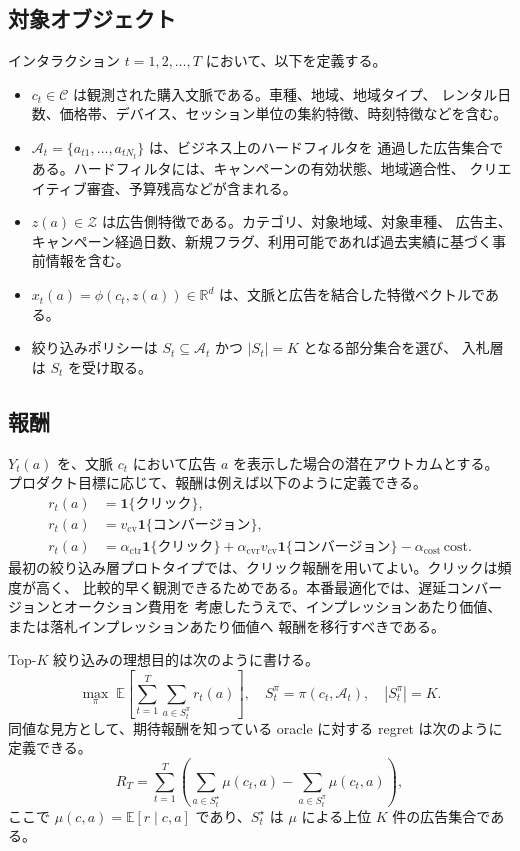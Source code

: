 \documentclass[uplatex,dvipdfmx,11pt,a4paper]{bxjsarticle}
\newcommand{\R}{\mathbb{R}}
\newcommand{\E}{\mathbb{E}}
\newcommand{\ind}{\mathbf{1}}
\begin{document}
\subsection{対象オブジェクト}
インタラクション $t=1,2,\ldots,T$ において、以下を定義する。
\begin{itemize}[leftmargin=2em]
  \item $c_t \in \mathcal{C}$ は観測された購入文脈である。車種、地域、地域タイプ、
  レンタル日数、価格帯、デバイス、セッション単位の集約特徴、時刻特徴などを含む。
  \item $\mathcal{A}_t = \{a_{t1},\ldots,a_{tN_t}\}$ は、ビジネス上のハードフィルタを
  通過した広告集合である。ハードフィルタには、キャンペーンの有効状態、地域適合性、
  クリエイティブ審査、予算残高などが含まれる。
  \item $z(a) \in \mathcal{Z}$ は広告側特徴である。カテゴリ、対象地域、対象車種、
  広告主、キャンペーン経過日数、新規フラグ、利用可能であれば過去実績に基づく事前情報を含む。
  \item $x_t(a)=\phi(c_t,z(a))\in\R^d$ は、文脈と広告を結合した特徴ベクトルである。
  \item 絞り込みポリシーは $S_t\subseteq\mathcal{A}_t$ かつ $|S_t|=K$ となる部分集合を選び、
  入札層は $S_t$ を受け取る。
\end{itemize}

\subsection{報酬}
$Y_t(a)$ を、文脈 $c_t$ において広告 $a$ を表示した場合の潜在アウトカムとする。
プロダクト目標に応じて、報酬は例えば以下のように定義できる。
\begin{align}
  r_t(a) &= \ind\{\text{クリック}\}, \\
  r_t(a) &= v_{\mathrm{cv}}\ind\{\text{コンバージョン}\}, \\
  r_t(a) &= \alpha_{\mathrm{ctr}}\ind\{\text{クリック}\}
          + \alpha_{\mathrm{cvr}}v_{\mathrm{cv}}\ind\{\text{コンバージョン}\}
          - \alpha_{\mathrm{cost}}\,\mathrm{cost}.
\end{align}
最初の絞り込み層プロトタイプでは、クリック報酬を用いてよい。クリックは頻度が高く、
比較的早く観測できるためである。本番最適化では、遅延コンバージョンとオークション費用を
考慮したうえで、インプレッションあたり価値、または落札インプレッションあたり価値へ
報酬を移行すべきである。

Top-$K$ 絞り込みの理想目的は次のように書ける。
\begin{equation}
  \max_{\pi}\; \E\left[\sum_{t=1}^{T}\sum_{a\in S_t^\pi} r_t(a)\right],
  \quad S_t^\pi = \pi(c_t,\mathcal{A}_t),\quad |S_t^\pi|=K.
\end{equation}
同値な見方として、期待報酬を知っている oracle に対する regret は次のように定義できる。
\begin{equation}
  R_T = \sum_{t=1}^{T}
  \left(
    \sum_{a\in S_t^\star}\mu(c_t,a)
    - \sum_{a\in S_t^\pi}\mu(c_t,a)
  \right),
\end{equation}
ここで $\mu(c,a)=\E[r\mid c,a]$ であり、$S_t^\star$ は $\mu$ による上位 $K$ 件の広告集合である。
\end{document}
